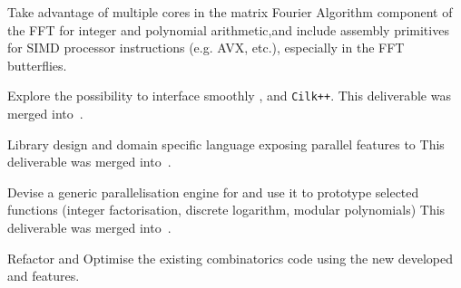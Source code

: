 \begin{workpackage}
\begin{wpdelivs}
\begin{wpdeliv}[due=18,miles=proto1,id=FFT,dissem=PU,nature=DEM, lead=UK,issue=120, status=delivered, blog=https://wbhart.blogspot.fr/2017/02/parallelising-integer-and-polynomial.html]
    {Take advantage of multiple cores in the matrix Fourier Algorithm component of the FFT for integer and polynomial arithmetic,and include assembly primitives for SIMD processor instructions (e.g. AVX, etc.), especially in the FFT butterflies.}
\end{wpdeliv}
  \begin{wpdeliv}[due=24,miles=proto1,id=cython-pythran-cilk,dissem=PU,nature=DEM,lead=PS,issue=121,status=canceled]
    {Explore the possibility to interface smoothly \Pythran, \Cython and \texttt{Cilk++}.}
    This deliverable was merged into~.
  \end{wpdeliv}
  \begin{wpdeliv}[due=24,miles=proto1,id=LinBox-DSL,dissem=PU,nature=R,lead=UJF,issue=122,status=canceled]
    {Library design and domain specific language exposing \Linbox parallel features to \Sage}
    This deliverable was merged into~.
  \end{wpdeliv}
  \begin{wpdeliv}[due=24,id=pari-hpc1,dissem=PU,nature=DEM,lead=UB,issue=108,status=canceled]
    {Devise a generic parallelisation engine for \Pari and use it to prototype selected functions
      (integer factorisation, discrete logarithm, modular polynomials)}
    This deliverable was merged into~.
  \end{wpdeliv}
  \begin{wpdeliv}[due=36,miles=hpc-prototype,id=sage-HPCcombi,dissem=PU,nature=DEM,lead=UB,issue=109]
      {Refactor and Optimise the existing combinatorics \Sage code using the new developed \Pythran and \Cython features.}
  \end{wpdeliv}

\end{wpdelivs}
\end{workpackage}
